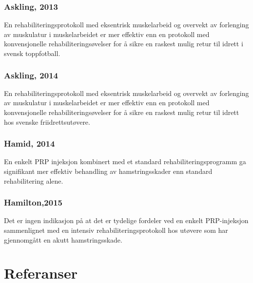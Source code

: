 \documentclass[
]{book}
\begin{document}
\hypertarget{askling-2013-askling2013-1}{%
\subsubsection{\texorpdfstring{Askling, 2013 \citep{askling2013}}{Askling, 2013 {[}@askling2013{]}}}\label{askling-2013-askling2013-1}}

En rehabiliteringsprotokoll med eksentrisk muskelarbeid og overvekt av forlenging av muskulatur i muskelarbeidet er mer effektiv enn en protokoll med konvensjonelle rehabiliteringsøvelser for å sikre en raskest mulig retur til idrett i svensk toppfotball.

\hypertarget{askling-2014-askling2014-1}{%
\subsubsection{\texorpdfstring{Askling, 2014 \citep{askling2014}}{Askling, 2014 {[}@askling2014{]}}}\label{askling-2014-askling2014-1}}

En rehabiliteringsprotokoll med eksentrisk muskelarbeid og overvekt av forlenging av muskulatur i muskelarbeidet er mer effektiv enn en protokoll med konvensjonelle rehabiliteringsøvelser for å sikre en raskest mulig retur til idrett hos svenske friidrettsutøvere.

\hypertarget{hamid-2014-ahamid2014-1}{%
\subsubsection{\texorpdfstring{Hamid, 2014 \citep{ahamid2014}}{Hamid, 2014 {[}@ahamid2014{]}}}\label{hamid-2014-ahamid2014-1}}

En enkelt PRP injeksjon kombinert med et standard rehabiliteringsprogramm ga signifikant mer effektiv behandling av hamstringsskader enn standard rehabilitering alene.

\hypertarget{hamilton2015-hamilton2015-1}{%
\subsubsection{\texorpdfstring{Hamilton,2015 \citep{hamilton2015}}{Hamilton,2015 {[}@hamilton2015{]}}}\label{hamilton2015-hamilton2015-1}}

Det er ingen indikasjon på at det er tydelige fordeler ved en enkelt PRP-injeksjon sammenlignet med en intensiv rehabiliteringsprotokoll hos utøvere som har gjennomgått en akutt hamstringsskade.

\hypertarget{referanser-1}{%
\section{Referanser}\label{referanser-1}}
\end{document}
